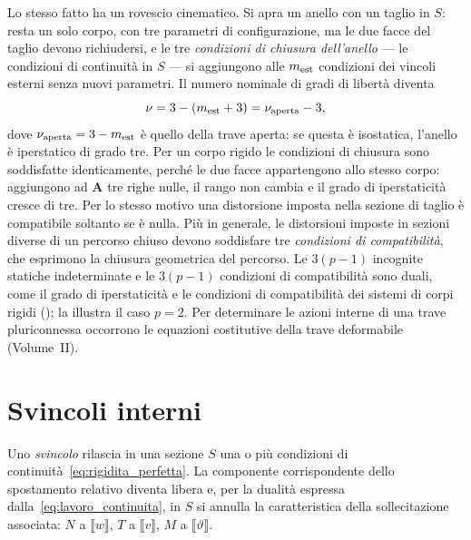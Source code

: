 Lo stesso fatto ha un rovescio cinematico. Si apra un
anello con un taglio in $S$: resta un solo corpo, con tre
parametri di configurazione, ma le due facce del taglio
devono richiudersi, e le tre \emph{condizioni di chiusura
	dell'anello}
--- le condizioni di continuità in $S$ --- si aggiungono
alle $m_{\rm est}$ condizioni dei vincoli esterni senza
nuovi parametri. Il numero nominale di gradi di libertà
diventa
\begin{equation*}
	\nu = 3 - (m_{\rm est} + 3) = \nu_{\rm aperta} - 3,
\end{equation*}
dove $\nu_{\rm aperta} = 3 - m_{\rm est}$ è quello della
trave aperta: se questa è isostatica, l'anello è
iperstatico di grado tre. Per un corpo rigido le
condizioni di chiusura sono soddisfatte identicamente,
perché le due facce appartengono allo stesso corpo:
aggiungono ad $\bm{A}$ tre righe nulle, il rango non
cambia e il grado di iperstaticità cresce di tre. Per lo
stesso motivo una distorsione imposta nella sezione di
taglio è compatibile soltanto se è nulla. Più in
generale, le distorsioni imposte in sezioni diverse di
un percorso chiuso devono soddisfare tre \emph{condizioni
	di compatibilità},
che esprimono la chiusura geometrica del percorso. Le
$3(p-1)$ incognite statiche indeterminate e le $3(p-1)$
condizioni di compatibilità sono duali, come il grado di
iperstaticità e le condizioni di compatibilità dei sistemi
di corpi rigidi (); la
 illustra il caso $p = 2$.
Per determinare le azioni interne di una trave
pluriconnessa occorrono le equazioni costitutive della
trave deformabile (Volume~II).





\section{Svincoli interni}
\label{sec:svincoli_interni}

Uno \emph{svincolo} rilascia in
una sezione $S$ una o più condizioni di
continuità~\eqref{eq:rigidita_perfetta}. La componente
corrispondente dello spostamento relativo diventa libera
e, per la dualità espressa dalla~\eqref{eq:lavoro_continuita},
in $S$ si annulla la caratteristica della sollecitazione
associata: $N$ a $\llbracket w \rrbracket$, $T$ a
$\llbracket v \rrbracket$, $M$ a
$\llbracket \vartheta \rrbracket$.

